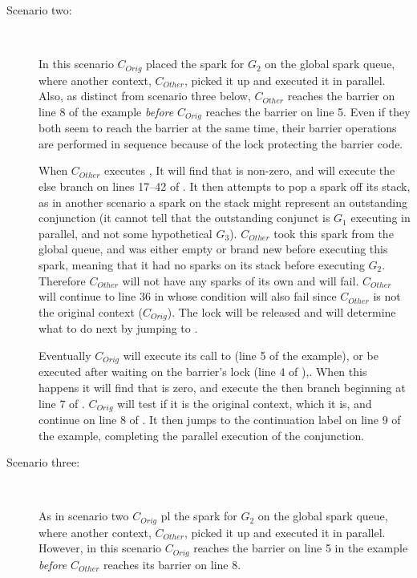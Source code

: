\begin{description}
    \item[Scenario two:]~

    In this scenario $C_{Orig}$ placed the spark for $G_2$ on the
    global spark queue,
    where another context, $C_{Other}$, picked it up and executed it
    in parallel.
    Also, as distinct from scenario three below,
    $C_{Other}$ reaches the barrier on line 8 of the example \emph{before}
    $C_{Orig}$ reaches the barrier on line 5.
    Even if they both seem to reach the barrier at the same time,
    their barrier operations are performed in sequence because of the
    lock protecting the barrier code.

    When $C_{Other}$ executes \joinandcontinue,
    It will find that  is non-zero,
    and will execute the else branch on lines 17--42 of \joinandcontinue.
    It then attempts to pop a spark off its stack,
    as in another scenario a spark on the stack might represent an
    outstanding conjunction
    (it cannot tell that the outstanding conjunct is $G_1$ executing in
    parallel, and not some hypothetical $G_3$).
    $C_{Other}$ took this spark from the global queue,
    and was either empty or brand new before executing this spark,
    meaning that it had no sparks on its stack before executing $G_2$.
    Therefore $C_{Other}$ will not have any sparks of its own and
     will fail.
    $C_{Other}$ will continue to line 36 in \joinandcontinue
    whose condition will also fail since $C_{Other}$
    is not the original context ($C_{Orig}$).
    The lock will be released and \joinandcontinue will determine what to do
    next by jumping to \idle.

    Eventually $C_{Orig}$ will execute its call to \joinandcontinue
    (line 5 of the example),
    or be executed after waiting on the barrier's lock (line 4 of
    \joinandcontinue),.
    When this happens it will find that 
    is zero,
    and execute the then branch beginning at line 7 of \joinandcontinue.
    $C_{Orig}$ will test if it is the original context,
    which it is,
    and continue on line 8 of \joinandcontinue.
    It then jumps to the continuation label on line 9 of the example,
    completing the parallel execution of the conjunction.

    \item[Scenario three:]~

    As in scenario two $C_{Orig}$ pl the spark for $G_2$ on the global spark
    queue,
    where another context, $C_{Other}$, picked it up and executed it
    in parallel.
    However,
    in this scenario
    $C_{Orig}$ reaches the barrier on line 5 in the example \emph{before}
    $C_{Other}$ reaches its barrier on line 8.


\end{description}
